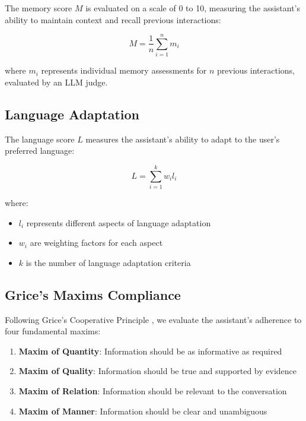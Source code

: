 \documentclass[12pt]{article}
\begin{document}
The memory score $M$ is evaluated on a scale of 0 to 10, measuring the assistant's ability to maintain context and recall previous interactions:

\begin{equation}
    M = \frac{1}{n}\sum_{i=1}^{n} m_i
\end{equation}

where $m_i$ represents individual memory assessments for $n$ previous interactions, evaluated by an LLM judge.

\subsection{Language Adaptation}

The language score $L$ measures the assistant's ability to adapt to the user's preferred language:

\begin{equation}
    L = \sum_{i=1}^{k} w_i l_i
\end{equation}

where:
\begin{itemize}
    \item $l_i$ represents different aspects of language adaptation
    \item $w_i$ are weighting factors for each aspect
    \item $k$ is the number of language adaptation criteria
\end{itemize}

\subsection{Grice's Maxims Compliance}

Following Grice's Cooperative Principle \cite{grice1975logic}, we evaluate the assistant's adherence to four fundamental maxims:

\begin{enumerate}
    \item \textbf{Maxim of Quantity}: Information should be as informative as required
    \item \textbf{Maxim of Quality}: Information should be true and supported by evidence
    \item \textbf{Maxim of Relation}: Information should be relevant to the conversation
    \item \textbf{Maxim of Manner}: Information should be clear and unambiguous
\end{enumerate}
\end{document}
